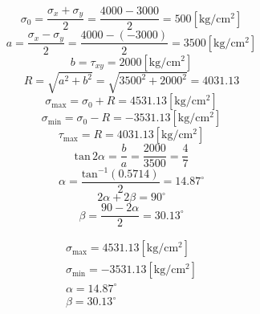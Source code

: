 \documentclass[letter,10pt,twoside]{article}
\begin{document}
\begin{equation*}
    \sigma_0 = \frac{\sigma_x + \sigma_y}{2}
             = \frac{4000 - 3000}{2}
             = 500[\text{kg}/\text{cm}^2]
\end{equation*}
\begin{equation*}
    a = \frac{\sigma_x - \sigma_y}{2}
      = \frac{4000 - (-3000)}{2}
      = 3500[\text{kg}/\text{cm}^2]
\end{equation*}
\begin{equation*}
    b = \tau_{xy}
      = 2000[\text{kg}/\text{cm}^2]
\end{equation*}
\begin{equation*}
    R = \sqrt{a^2 + b^2}
      = \sqrt{3500^2 + 2000^2}
      = 4031.13
\end{equation*}
\begin{equation*}
    \sigma_{\text{max}} = \sigma_0 + R
                        = 4531.13[\text{kg}/\text{cm}^2]
\end{equation*}
\begin{equation*}
    \sigma_{\text{min}} = \sigma_0 - R
                        = -3531.13[\text{kg}/\text{cm}^2]
\end{equation*}
\begin{equation*}
    \tau_{\text{max}} = R
                      = 4031.13[\text{kg}/\text{cm}^2]
\end{equation*}
\begin{equation*}
    \text{tan}\,2\alpha = \frac{b}{a}
                        = \frac{2000}{3500}
                        = \frac{4}{7}
\end{equation*}
\begin{equation*}
    \alpha = \frac{\text{tan}^{-1}(0.5714)}{2}
           = 14.87^\circ
\end{equation*}
\begin{equation*}
    2\alpha + 2\beta = 90^\circ
\end{equation*}
\begin{equation*}
    \beta = \frac{90 - 2\alpha}{2}
          = 30.13^\circ
\end{equation*}

\begin{equation*}
\boxed{
    \begin{array}{l}
        \sigma_{\text{max}} = 4531.13[\text{kg}/\text{cm}^2] \\
        \sigma_{\text{min}} = -3531.13[\text{kg}/\text{cm}^2] \\
        \alpha = 14.87^\circ \\
        \beta = 30.13^\circ
    \end{array}
}
\end{equation*}
\end{document}
